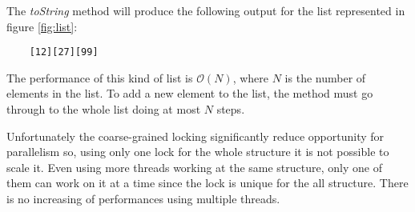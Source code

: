 The \emph{toString} method will produce the following output for the list represented in figure \ref{fig:list}:\newline

\begin{lstlisting}
	[12][27][99]
\end{lstlisting}


The performance of this kind of list is $\mathcal{O}(N)$, where $N$ is the number of elements in the list. To add a new element to the list, the method must go through to the whole list doing at most $N$ steps.\newline


Unfortunately the coarse-grained locking significantly reduce opportunity for parallelism so, using only one lock for the whole structure it is not possible to scale it. Even using more threads working at the same structure, only one of them can work on it at a time since the lock is unique for the all structure. There is no increasing of performances using multiple threads.







